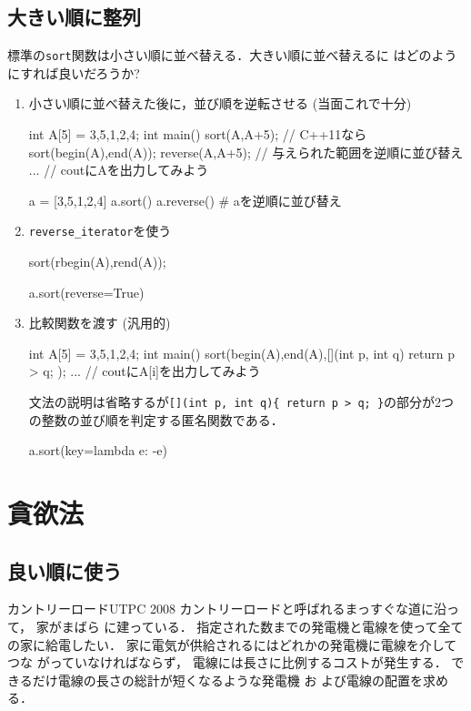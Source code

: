 \subsection{大きい順に整列}
標準の\texttt{sort}関数は小さい順に並べ替える．大きい順に並べ替えるに
はどのようにすれば良いだろうか?
\begin{enumerate}
\item 小さい順に並べ替えた後に，並び順を逆転させる (当面これで十分)
\begin{cbox}
int A[5] = {3,5,1,2,4};
int main() {
   sort(A,A+5);
   // C++11なら sort(begin(A),end(A));
   reverse(A,A+5); // 与えられた範囲を逆順に並び替え
   ...  // coutにAを出力してみよう
}
\end{cbox}
\begin{pybox}
a = [3,5,1,2,4]
a.sort()
a.reverse() # aを逆順に並び替え
\end{pybox}
\item \texttt{reverse\_iterator}を使う
\begin{c14box}[emph={rbegin,rend}]
  sort(rbegin(A),rend(A));
\end{c14box}
\begin{pybox}
a.sort(reverse=True) 
\end{pybox}
\item 比較関数を渡す (汎用的)
\begin{c11box}
int A[5] = {3,5,1,2,4};
int main() {
   sort(begin(A),end(A),[](int p, int q){ return p > q; });
   ...  // coutにA[i]を出力してみよう
}
\end{c11box}
文法の説明は省略するが\texttt{[](int p, int q)\{ return p > q; \}}の部分が2つの整数の並び順を判定する匿名関数である．
\begin{pybox}
a.sort(key=lambda e: -e)  
\end{pybox}
\end{enumerate}

\section{貪欲法}

\subsection{良い順に使う}
\begin{pbox}{カントリーロード}{UTPC 2008}
カントリーロードと呼ばれるまっすぐな道に沿って， 家がまばら
に建っている． 指定された数までの発電機と電線を使って全ての家に給電したい． 
家に電気が供給されるにはどれかの発電機に電線を介してつな
がっていなければならず， 電線には長さに比例するコストが発生する． できるだけ電線の長さの総計が短くなるような発電機 お
よび電線の配置を求める．

\end{pbox}

